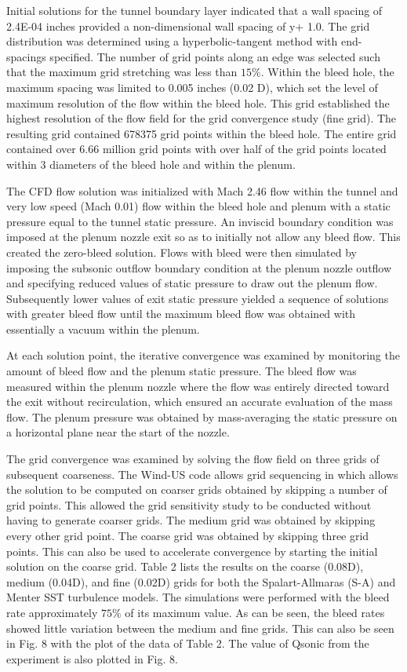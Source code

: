 Initial solutions for the tunnel boundary layer indicated that a wall spacing of 2.4E-04 inches provided a non-dimensional wall spacing of y+  1.0. The grid distribution was determined using a hyperbolic-tangent method with end-spacings specified. The number of grid points along an edge was selected such that the maximum grid stretching was less than $15\%$. Within the bleed hole, the maximum spacing was limited to 0.005 inches (0.02 D), which set the level of maximum resolution of the flow within the bleed hole. This grid established the highest resolution of the flow field for the grid convergence study (fine grid). The resulting grid contained 678375 grid points within the bleed hole. The entire grid contained over 6.66 million grid points with over half of the grid points located within 3 diameters of the bleed hole and within the plenum. 

The CFD flow solution was initialized with Mach 2.46 flow within the tunnel and very low speed (Mach 0.01) flow within the bleed hole and plenum with a static pressure equal to the tunnel static pressure. An inviscid boundary condition was imposed at the plenum nozzle exit so as to initially not allow any bleed flow. This created the zero-bleed solution. Flows with bleed were then simulated by imposing the subsonic outflow boundary condition at the plenum nozzle outflow and specifying reduced values of static pressure to draw out the plenum flow. Subsequently lower values of exit static pressure yielded a sequence of solutions with greater bleed flow until the maximum bleed flow was obtained with essentially a vacuum within the plenum. 

At each solution point, the iterative convergence was examined by monitoring the amount of bleed flow and the plenum static pressure. The bleed flow was measured within the plenum nozzle where the flow was entirely directed toward the exit without recirculation, which ensured an accurate evaluation of the mass flow. The plenum pressure was obtained by mass-averaging the static pressure on a horizontal plane near the start of the nozzle. 

The grid convergence was examined by solving the flow field on three grids of subsequent coarseness. The Wind-US code allows grid sequencing in which allows the solution to be computed on coarser grids obtained by skipping a number of grid points. This allowed the grid sensitivity study to be conducted without having to generate coarser grids. The medium grid was obtained by skipping every other grid point. The coarse grid was obtained by skipping three grid points. This can also be used to accelerate convergence by starting the initial solution on the coarse grid. Table 2 lists the results on the coarse (0.08D), medium (0.04D), and fine (0.02D) grids for both the Spalart-Allmaras (S-A) and Menter SST turbulence models. The simulations were performed with the bleed rate approximately $75\%$ of its maximum value. As can be seen, the bleed rates showed little variation between the medium and fine grids. This can also be seen in Fig. 8 with the plot of the data of Table 2. The value of Qsonic from the experiment is also plotted in Fig. 8. 

